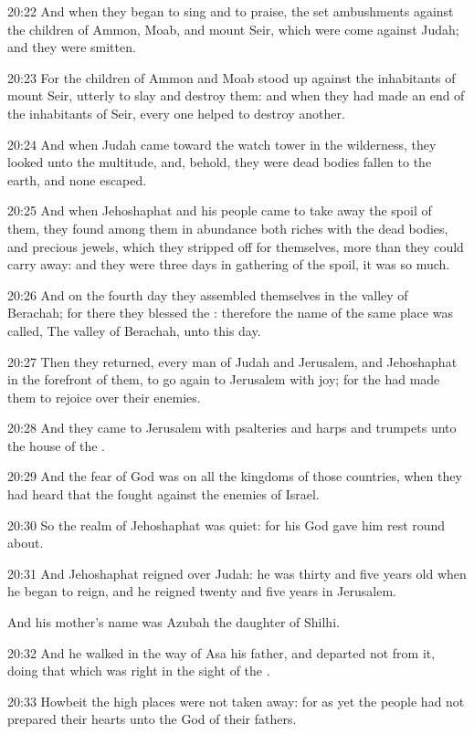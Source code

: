 20:22 And when they began to sing and to praise, the \LORD set ambushments against the children of Ammon, Moab, and mount Seir, which were come against Judah; and they were smitten.

20:23 For the children of Ammon and Moab stood up against the inhabitants of mount Seir, utterly to slay and destroy them: and when they had made an end of the inhabitants of Seir, every one helped to destroy another.

20:24 And when Judah came toward the watch tower in the wilderness, they looked unto the multitude, and, behold, they were dead bodies fallen to the earth, and none escaped.

20:25 And when Jehoshaphat and his people came to take away the spoil of them, they found among them in abundance both riches with the dead bodies, and precious jewels, which they stripped off for themselves, more than they could carry away: and they were three days in gathering of the spoil, it was so much.

20:26 And on the fourth day they assembled themselves in the valley of Berachah; for there they blessed the \LORD: therefore the name of the same place was called, The valley of Berachah, unto this day.

20:27 Then they returned, every man of Judah and Jerusalem, and Jehoshaphat in the forefront of them, to go again to Jerusalem with joy; for the \LORD had made them to rejoice over their enemies.

20:28 And they came to Jerusalem with psalteries and harps and trumpets unto the house of the \LORD.

20:29 And the fear of God was on all the kingdoms of those countries, when they had heard that the \LORD fought against the enemies of Israel.

20:30 So the realm of Jehoshaphat was quiet: for his God gave him rest round about.

20:31 And Jehoshaphat reigned over Judah: he was thirty and five years old when he began to reign, and he reigned twenty and five years in Jerusalem.

And his mother's name was Azubah the daughter of Shilhi.

20:32 And he walked in the way of Asa his father, and departed not from it, doing that which was right in the sight of the \LORD.

20:33 Howbeit the high places were not taken away: for as yet the people had not prepared their hearts unto the God of their fathers.

